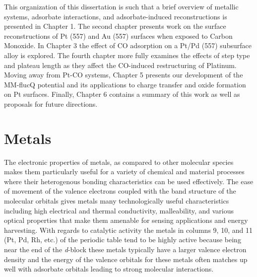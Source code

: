 
This organization of this dissertation is such that a brief overview of
metallic systems, adsorbate interactions, and adsorbate-induced reconstructions
is presented in Chapter 1.  The second chapter presents work on the surface
reconstructions of Pt (557) and Au (557) surfaces when exposed to Carbon
Monoxide. In Chapter 3 the effect of CO adsorption on a Pt/Pd (557) subsurface
alloy is explored. The fourth chapter more fully examines the effects of step
type and plateau length as they affect the CO-induced restructuring of
Platinum. Moving away from Pt-CO systems, Chapter 5 presents our development of
the MM-flucQ potential and its applications to charge transfer and oxide
formation on Pt surfaces. Finally, Chapter 6 contains a summary of this work as
well as proposals for future directions.

\section{Metals}
The electronic properties of metals, as compared to other molecular species
makes them particularly useful for a variety of chemical and material processes
where their heterogenous bonding characteristics can be used effectively. The
ease of movement of the valence electrons coupled with the band structure of
the molecular orbitals gives metals many technologically useful characteristics
including high electrical and thermal conductivity, malleability, and various
optical properties that make them amenable for sensing applications and energy
harvesting. With regards to catalytic activity the metals in columns 9, 10, and
11 (Pt, Pd, Rh, etc.) of the periodic table tend to be highly active because
being near the end of the {\it d}-block these metals typically have a larger
valence electron density and the energy of the valence orbitals for these
metals often matches up well with adsorbate orbitals leading to strong
molecular interactions.


